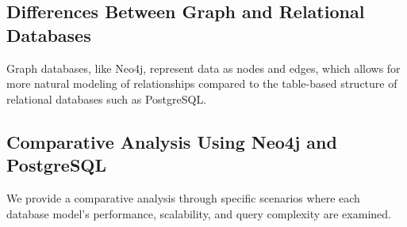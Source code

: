 \subsection{Differences Between Graph and Relational Databases}
Graph databases, like Neo4j, represent data as nodes and edges, which allows for more natural modeling of relationships compared to the table-based structure of relational databases such as PostgreSQL.

\subsection{Comparative Analysis Using Neo4j and PostgreSQL}
We provide a comparative analysis through specific scenarios where each database model's performance, scalability, and query complexity are examined.
